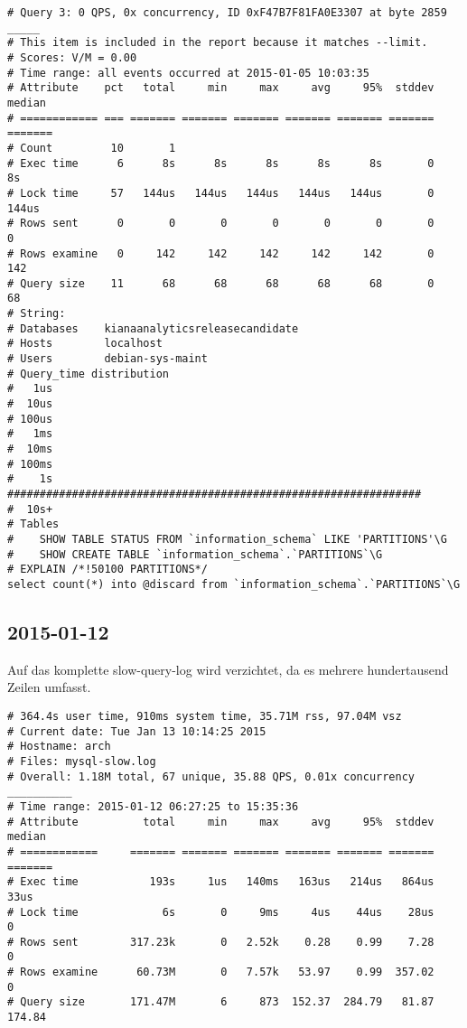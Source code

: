 \begin{appendix}
\begin{footnotesize}
\begin{verbatim}
# Query 3: 0 QPS, 0x concurrency, ID 0xF47B7F81FA0E3307 at byte 2859 _____
# This item is included in the report because it matches --limit.
# Scores: V/M = 0.00
# Time range: all events occurred at 2015-01-05 10:03:35
# Attribute    pct   total     min     max     avg     95%  stddev  median
# ============ === ======= ======= ======= ======= ======= ======= =======
# Count         10       1
# Exec time      6      8s      8s      8s      8s      8s       0      8s
# Lock time     57   144us   144us   144us   144us   144us       0   144us
# Rows sent      0       0       0       0       0       0       0       0
# Rows examine   0     142     142     142     142     142       0     142
# Query size    11      68      68      68      68      68       0      68
# String:
# Databases    kianaanalyticsreleasecandidate
# Hosts        localhost
# Users        debian-sys-maint
# Query_time distribution
#   1us
#  10us
# 100us
#   1ms
#  10ms
# 100ms
#    1s  ################################################################
#  10s+
# Tables
#    SHOW TABLE STATUS FROM `information_schema` LIKE 'PARTITIONS'\G
#    SHOW CREATE TABLE `information_schema`.`PARTITIONS`\G
# EXPLAIN /*!50100 PARTITIONS*/
select count(*) into @discard from `information_schema`.`PARTITIONS`\G

\end{verbatim}
\end{footnotesize}

\subsection{2015-01-12}

Auf das komplette slow-query-log wird verzichtet, da es mehrere hundertausend Zeilen umfasst.

\begin{footnotesize}
\begin{verbatim}
# 364.4s user time, 910ms system time, 35.71M rss, 97.04M vsz
# Current date: Tue Jan 13 10:14:25 2015
# Hostname: arch
# Files: mysql-slow.log
# Overall: 1.18M total, 67 unique, 35.88 QPS, 0.01x concurrency __________
# Time range: 2015-01-12 06:27:25 to 15:35:36
# Attribute          total     min     max     avg     95%  stddev  median
# ============     ======= ======= ======= ======= ======= ======= =======
# Exec time           193s     1us   140ms   163us   214us   864us    33us
# Lock time             6s       0     9ms     4us    44us    28us       0
# Rows sent        317.23k       0   2.52k    0.28    0.99    7.28       0
# Rows examine      60.73M       0   7.57k   53.97    0.99  357.02       0
# Query size       171.47M       6     873  152.37  284.79   81.87  174.84


\end{verbatim}
\end{footnotesize}
\end{appendix}
